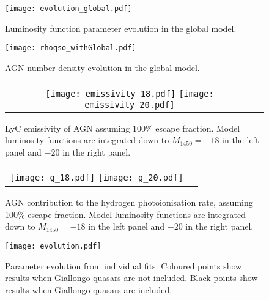 \documentclass[a4paper,fleqn,usenatbib]{mnras}
\begin{document}
\begin{figure*}
  \begin{center}
    \texttt{[image: evolution\_global.pdf]}
  \end{center}
  \caption{Luminosity function parameter evolution in the global model.}
\end{figure*}

\begin{figure*}
  \begin{center}
    \texttt{[image: rhoqso\_withGlobal.pdf]}
  \end{center}
  \caption{AGN number density evolution in the global model.}
  \label{fig:rhoqso}
\end{figure*}

\begin{figure*}
  \begin{center}
    \begin{tabular}{cc}
    \texttt{[image: emissivity\_18.pdf]}
    \texttt{[image: emissivity\_20.pdf]}
    \end{tabular}
  \end{center}
  \caption{LyC emissivity of AGN assuming 100\% escape fraction.
    Model luminosity functions are integrated down to $M_{1450}=-18$
    in the left panel and $-20$ in the right panel.}
  \label{fig:emissivity}
\end{figure*}

\begin{figure*}
  \begin{center}
    \begin{tabular}{cc}
    \texttt{[image: g\_18.pdf]}
    \texttt{[image: g\_20.pdf]}
    \end{tabular}
  \end{center}
  \caption{AGN contribution to the hydrogen photoionisation rate,
    assuming 100\% escape fraction.  Model luminosity functions are
    integrated down to $M_{1450}=-18$ in the left panel and $-20$ in
    the right panel.}
  \label{fig:gammapi}
\end{figure*}

\begin{figure*}
  \begin{center}
    \texttt{[image: evolution.pdf]}
  \end{center}
  \caption{Parameter evolution from individual fits.  Coloured points
    show results when Giallongo quasars are not included.  Black
    points show results when Giallongo quasars are included.}
\end{figure*}
\end{document}

